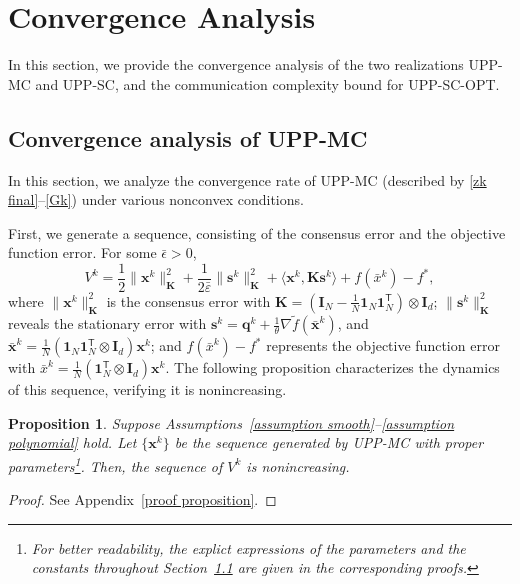 \documentclass[12pt,draftcls,onecolumn]{IEEEtran}
\newcommand{\bK}{{\mathbf{K}}}
\newtheorem{proposition}{Proposition}
\begin{document}
    

\section{Convergence Analysis}\label{section: convergence analysis}
In this section, we provide the convergence analysis of the two realizations UPP-MC and UPP-SC, and the communication complexity bound for UPP-SC-OPT.
\subsection{Convergence analysis of UPP-MC}\label{general convergence}
In this section, we analyze the convergence rate of UPP-MC (described by \eqref{zk final}--\eqref{Gk}) under various nonconvex conditions.

First, we generate a sequence, consisting of the consensus error and the objective function error. For some $\bar{\epsilon}>0$, 
\begin{equation}
	\label{def V} V^k = \frac{1}{2} \|\mathbf{x}^k\|^2_\mathbf{K} + \frac{1}{2\bar{\varepsilon}}\|\mathbf{s}^k\|^2_{\bK}+ \langle \mathbf{x}^k, \mathbf{K}\mathbf{s}^k \rangle + f(\bar{x}^k) - f^*,
\end{equation}
where $\|\mathbf{x}^k\|^2_\mathbf{K}$ is the consensus error with $\mathbf{K} =(\mathbf{I}_N - \frac{1}{N} \mathbf{1}_N \mathbf{1}_N ^{\mathsf{T}}) \otimes \mathbf{I}_d$; $\|\mathbf{s}^k\|^2_{\bK}$ reveals the stationary error with $\mathbf{s}^k=\mathbf{q}^k+\frac{1}{\theta}\nabla \tilde{f}(\bar{\mathbf{x}}^k)$, and $\bar{\mathbf{x}}^k=\frac{1}{N}(\mathbf{1}_N\mathbf{1}^\mathsf{T}_N\otimes \mathbf{I}_d)\mathbf{x}^k$; and $f(\bar{x}^k) - f^*$ represents the objective function error with $\bar{x}^k = \frac{1}{N}(\mathbf{1}^\mathsf{T}_N\otimes \mathbf{I}_d)\mathbf{x}^k$.
The following proposition characterizes the dynamics of this sequence, verifying it is nonincreasing.

\begin{proposition}\label{proposition parameter range}
	Suppose Assumptions~\ref{assumption smooth}--\ref{assumption polynomial} hold. Let $\{\mathbf{x}^k\}$ be the sequence generated by UPP-MC with proper parameters\footnote{For better readability, the explict expressions of the parameters and the constants throughout Section~\ref{general convergence} are given in the corresponding proofs.}. Then, the sequence of $V^k$ is nonincreasing.
\end{proposition}
\begin{proof}
	See Appendix~\ref{proof proposition}.
\end{proof}
\end{document}
